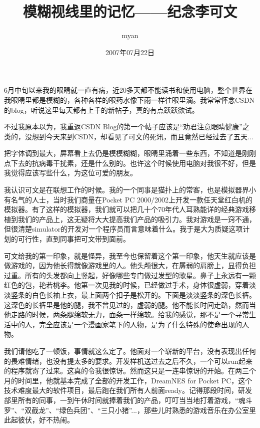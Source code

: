 \documentclass{article}
\title{模糊视线里的记忆——纪念李可文}
\author{myan}
\date{2007年07月22日}
\begin{document}

\maketitle

\Large

6月中旬以来我的眼睛就一直有病，近20多天都不能读书和使用电脑，整个世界在我眼睛里都是模糊的，各种各样的眼药水像下雨一样往眼里滴。我常常怀念CSDN的blog，听说这里每天都有上千的新帖子，真的有点跃跃欲试。

不过我原本以为，我重返CSDN Blog的第一个帖子应该是“劝君注意眼睛健康”之类的，没想到今天来到CSDN，却看见了可文的死讯，而且竟然已经过去了五天...

把字体调到最大，屏幕看上去仍是模模糊糊，眼睛里涌着一些东西，不知道是刚刚点下去的抗病毒干扰素，还是什么别的。也许这个时候使用电脑对我很不好，但是我觉得应该写些什么，为这位可爱的朋友。

\newpage

我认识可文是在联想工作的时候。我的一个同事是猫扑上的常客，也是模拟器界小有名气的人士，当时我们商量在Pocket PC 2000/2002上开发一款任天堂红白机的模拟器。有了这样的模拟器，我们就可以把几十个70年代人耳熟能详的经典游戏移植到我们的产品上，这无疑将大大提高我们产品的吸引力。我对游戏是一窍不通，但很清楚simulator的开发对一个程序员而言意味着什么。我于是大为质疑这项计划的可行性，直到同事把可文带到面前。

可文给我的第一印象，就是怪异，我至今也保留着这个第一印象，他天生就应该是做游戏的，因为他长得就像游戏里的人。他头颅很大，在孱弱的肩膀上，显得负担过重。所有的头发都向上竖起，好像哪些专门做过发型的歌星。鼻子上永远有一颗红色的包，艳若桃李。他第一次见我的时候，已经做过手术，身体很虚弱，穿着淡淡竖条的白色长袖上衣，最上面两个扣子是松开的。下面是淡淡竖条的深色长裤。这深色的长裤里是他的腿，我不曾见过的，虚弱的腿。他不能长时间走路，然而当他走路的时候，两条腿绵软无力，面条一样绵软。给我的感觉，那不是一个寻常生活中的人，完全应该是一个漫画家笔下的人物，是为了什么特殊的使命出现的人物。

\newpage

我们请他吃了一顿饭，事情就这么定了。他面对一个崭新的平台，没有表现出任何的畏难情绪，也没有提太多的要求。开发样机送过去之后不久，一个可以run起来的程序就寄了过来。这真的令我很惊讶。然而这只是一连串惊讶的开始。在两三个月的时间里，他就基本完成了全部的开发工作，DreamNES for Pocket PC，这个技术难度最大的软件项目，最后跑在我们所有人前面ready。记得那段时间，研发部里所有的同事，一到午休时间就捧着我们的产品，叮叮当当地打着游戏，“魂斗罗”、“双截龙”、“绿色兵团”、“三只小猪”...，那些儿时熟悉的游戏音乐在办公室里此起彼伏，好不热闹。
\end{document}
